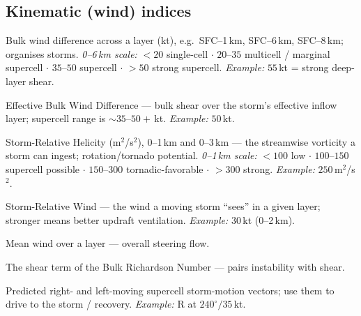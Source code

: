 \documentclass[11pt,openany]{report}
\begin{document}
\subsection{Kinematic (wind) indices}
\begin{description}[leftmargin=2.6cm,style=nextline]
  \item[Shear] Bulk wind difference across a layer (kt), e.g.\ SFC--1\,km, SFC--6\,km, SFC--8\,km;
        organises storms. \emph{0--6\,km scale:} $<\!20$ single-cell $\cdot$ $20$--$35$ multicell /
        marginal supercell $\cdot$ $35$--$50$ supercell $\cdot$ $>\!50$ strong supercell.
        \emph{Example:} $55$\,kt = strong deep-layer shear.
  \item[Eff Shear / EBWD] Effective Bulk Wind Difference --- bulk shear over the storm's effective
        inflow layer; supercell range is $\sim\!35$--$50\!+$\,kt. \emph{Example:} $50$\,kt.
  \item[SRH] Storm-Relative Helicity (m$^2$/s$^2$), 0--1\,km and 0--3\,km --- the streamwise
        vorticity a storm can ingest; rotation/tornado potential. \emph{0--1\,km scale:} $<\!100$
        low $\cdot$ $100$--$150$ supercell possible $\cdot$ $150$--$300$ tornadic-favorable $\cdot$
        $>\!300$ strong. \emph{Example:} $250$\,m$^2$/s$^2$.
  \item[SRW] Storm-Relative Wind --- the wind a moving storm ``sees'' in a given layer; stronger
        means better updraft ventilation. \emph{Example:} $30$\,kt (0--2\,km).
  \item[MnWind] Mean wind over a layer --- overall steering flow.
  \item[BRN Shear] The shear term of the Bulk Richardson Number --- pairs instability with shear.
  \item[Bunkers R / L] Predicted right- and left-moving supercell storm-motion vectors; use them to
        drive to the storm / recovery. \emph{Example:} R at $240^\circ / 35$\,kt.
\end{description}
\end{document}
